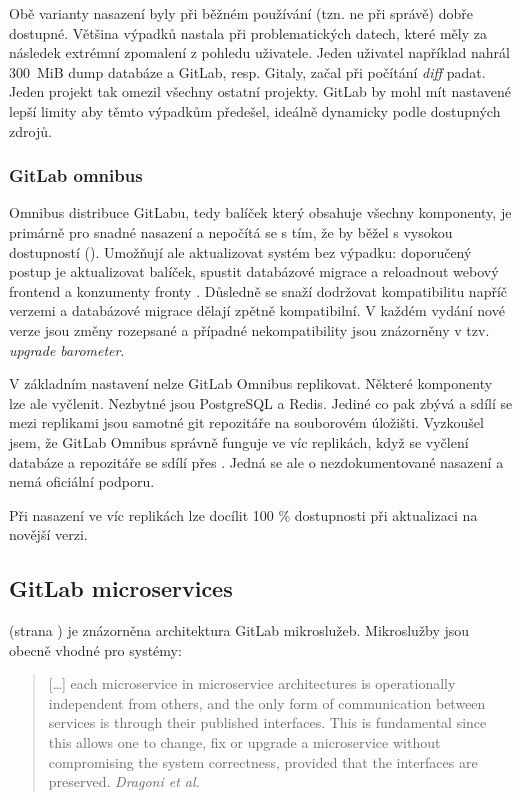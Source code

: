         Obě varianty nasazení byly při běžném používání (tzn. ne při správě) dobře dostupné. Většina výpadků nastala při problematických datech, které měly za následek extrémní zpomalení z pohledu uživatele. Jeden uživatel například nahrál $300$~MiB dump databáze a GitLab, resp. Gitaly, začal při počítání \textit{diff} padat. Jeden projekt tak omezil všechny ostatní projekty. GitLab by mohl mít nastavené lepší limity aby těmto výpadkům předešel, ideálně dynamicky podle dostupných zdrojů.

        \subsubsection{GitLab omnibus}
            Omnibus distribuce GitLabu, tedy balíček který obsahuje všechny komponenty, je primárně pro snadné nasazení a nepočítá se s tím, že by běžel s vysokou dostupností (\HA). Umožňují ale aktualizovat systém bez výpadku: doporučený postup je aktualizovat balíček, spustit databázové migrace a reloadnout webový frontend a konzumenty fronty \cite{gitlab-omnibus-update}. Důsledně se snaží dodržovat kompatibilitu napříč verzemi a databázové migrace dělají zpětně kompatibilní. V každém vydání nové verze jsou změny rozepsané a případné nekompatibility jsou znázorněny v tzv. \textit{upgrade barometer}.

            V základním nastavení nelze GitLab Omnibus replikovat. Některé komponenty lze ale vyčlenit. Nezbytné jsou PostgreSQL a Redis. Jediné co pak zbývá a sdílí se mezi replikami jsou samotné git repozitáře na souborovém úložišti. Vyzkoušel jsem, že GitLab Omnibus správně funguje ve víc replikách, když se vyčlení databáze a repozitáře se sdílí přes . Jedná se ale o nezdokumentované nasazení a nemá oficiální podporu.

            Při nasazení ve víc replikách lze docílit 100 \% dostupnosti při aktualizaci na novější verzi.

        \subsection{GitLab microservices}
             (strana \pageref{pic:gitlab-architecture}) je znázorněna architektura GitLab mikroslužeb. Mikroslužby jsou obecně vhodné pro  systémy:

            \begin{quote}
                [\ldots] each microservice in microservice architectures is operationally independent from others, and the only form of communication between services is through their published interfaces. This is fundamental since this allows one to change, fix or upgrade a microservice without compromising the system correctness, provided that the interfaces are preserved. \textit{Dragoni et al.~\cite{dragoni-microservices}}
            \end{quote}

